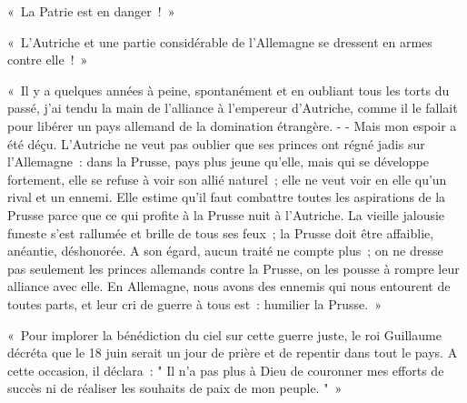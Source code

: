 \documentclass[french,twoside]{book} %
\newenvironment{quoteblock}%
  {\begin{quoting}}
  {\end{quoting}}
\newenvironment{quotebar}{%
    \def\FrameCommand{{\color{rubric!10!}\vrule width 0.5em} \hspace{0.9em}}%
    \def\OuterFrameSep{\itemsep} %
    \MakeFramed {\advance\hsize-\width \FrameRestore}
  }%
  {%
    \endMakeFramed
  }
\renewenvironment{quoteblock}%
  {%
    \savenotes
    \setstretch{0.9}
    \normalfont
    \begin{quotebar}
  }
  {%
    \end{quotebar}
    \spewnotes
  }
\begin{document}
\begin{quoteblock}
 \noindent « La Patrie est en danger ! »\par
 « L'Autriche et une partie considérable de l’Allemagne se dressent en armes contre elle ! »\par
 « Il y a quelques années à peine, spontanément et en oubliant tous les torts du passé, j’ai tendu la main de l’alliance à l’empereur d’Autriche, comme il le fallait pour libérer un pays allemand de la domination étrangère. - - Mais mon espoir a été déçu. L'Autriche ne veut pas oublier que ses princes ont régné jadis sur l’Allemagne : dans la Prusse, pays plus jeune qu’elle, mais qui se développe fortement, elle se refuse à voir son allié naturel ; elle ne veut voir en elle qu’un rival et un ennemi. Elle estime qu’il faut combattre toutes les aspirations de la Prusse parce que ce qui profite à la Prusse nuit à l’Autriche. La vieille jalousie funeste s’est rallumée et brille de tous ses feux ; la Prusse doit être affaiblie, anéantie, déshonorée. A son égard, aucun traité ne compte plus ; on ne dresse pas seulement les princes allemands contre la Prusse, on les pousse à rompre leur alliance avec elle. En Allemagne, nous avons des ennemis qui nous entourent de toutes parts, et leur cri de guerre à tous est : humilier la Prusse. »\par
 « Pour implorer la bénédiction du ciel sur cette guerre juste, le roi Guillaume décréta que le 18 juin serait un jour de prière et de repentir dans tout le pays. A cette occasion, il déclara : " Il n’a pas plus à Dieu de couronner mes efforts de succès ni de réaliser les souhaits de paix de mon peuple. " »
\end{quoteblock}
\end{document}
